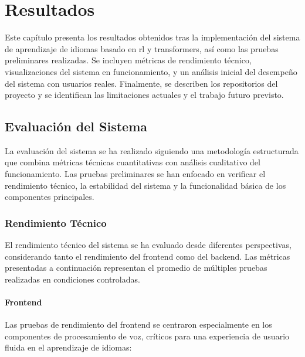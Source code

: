 \chapter{Resultados}
\label{chap:resultados}

Este capítulo presenta los resultados obtenidos tras la implementación del sistema de aprendizaje de idiomas basado en \gls{rl} y \gls{transformers}, así como las pruebas preliminares realizadas. Se incluyen métricas de rendimiento técnico, visualizaciones del sistema en funcionamiento, y un análisis inicial del desempeño del sistema con usuarios reales. Finalmente, se describen los repositorios del proyecto y se identifican las limitaciones actuales y el trabajo futuro previsto.

\section{Evaluación del Sistema}
\label{sec:evaluacion-sistema}

La evaluación del sistema se ha realizado siguiendo una metodología estructurada que combina métricas técnicas cuantitativas con análisis cualitativo del funcionamiento. Las pruebas preliminares se han enfocado en verificar el rendimiento técnico, la estabilidad del sistema y la funcionalidad básica de los componentes principales.

\subsection{Rendimiento Técnico}
\label{subsec:rendimiento-tecnico}

El rendimiento técnico del sistema se ha evaluado desde diferentes perspectivas, considerando tanto el rendimiento del frontend como del backend. Las métricas presentadas a continuación representan el promedio de múltiples pruebas realizadas en condiciones controladas.

\subsubsection{Frontend}
\label{subsubsec:frontend-rendimiento}

Las pruebas de rendimiento del frontend se centraron especialmente en los componentes de procesamiento de voz, críticos para una experiencia de usuario fluida en el aprendizaje de idiomas:

